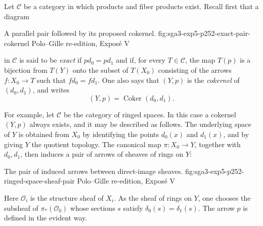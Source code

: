 \label{par:sga3-V-1-a}%
Let \(\mathscr C\) be a category in which products and
fiber products exist. Recall first that a diagram

  {A parallel pair followed by its proposed cokernel.}
  {fig:sga3-exp5-p252-exact-pair-cokernel}
  {Polo--Gille re-edition, Expos\'e V}

\noindent in \(\mathscr C\) is said to be \emph{exact} if
\(p d_0=p d_1\) and if, for every \(T\in\mathscr C\), the map \(T(p)\) is a
bijection from \(T(Y)\) onto the subset of \(T(X_0)\) consisting of the
arrows \(f:X_0\to T\) such that \(f d_0=f d_1\). One also says that
\((Y,p)\) is the \emph{cokernel} of \((d_0,d_1)\), and writes
\label{eq:sga3-V-1-cokernel}%
\begin{equation*}
  (Y,p)=\operatorname{Coker}(d_0,d_1).
\end{equation*}

\label{par:sga3-V-1-b}%
For example, let \(\mathscr C\) be the category of ringed spaces. In this
case a cokernel \((Y,p)\)
always exists, and it may be described as follows. The underlying
space of \(Y\) is obtained from \(X_0\) by identifying the points \(d_0(x)\)
and \(d_1(x)\), and by giving \(Y\) the quotient topology. The canonical map
\(\pi:X_0\to Y\), together with \(d_0,d_1\), then induces a pair of arrows
of sheaves of rings on \(Y\):

  {The pair of induced arrows between direct-image sheaves.}
  {fig:sga3-exp5-p252-ringed-space-sheaf-pair}
  {Polo--Gille re-edition, Expos\'e V}

Here \(\mathcal O_i\) is the structure sheaf of \(X_i\). As the sheaf of
rings on \(Y\), one chooses the subsheaf of \(\pi_*(\mathcal O_0)\) whose
sections \(s\) satisfy \(\delta_0(s)=\delta_1(s)\). The arrow \(p\) is
defined in the evident way.


